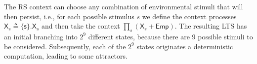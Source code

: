The RS context can choose any combination of environmental stimuli that will then persist, i.e., for each possible stimulus $s$ we define the context processes $\mathsf{X}_s \triangleq \{\mathsf{s}\}.\mathsf{X}_s$
%
and then take the context $\prod_s (\mathsf{X}_s + \mathsf{Emp})$.
The resulting LTS has an initial branching into $2^9$ different states, because there are $9$ possible stimuli to be considered. Subsequently, each of the $2^9$ states originates a deterministic computation, leading to some attractors. 


